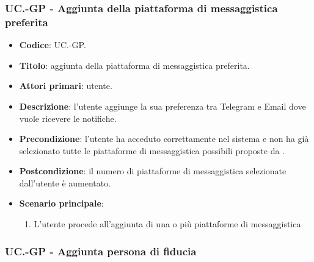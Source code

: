 	\subsubsection{UC\theuccount.\thesubuccount-GP - Aggiunta della piattaforma di messaggistica preferita}
		
		\begin{itemize}
			\item \textbf{Codice}: UC\theuccount.\thesubuccount-GP.
			\item \textbf{Titolo}: aggiunta della piattaforma di messaggistica preferita.
			\item \textbf{Attori primari}: utente.
			\item \textbf{Descrizione}: l’utente aggiunge la sua preferenza tra Telegram e Email dove vuole ricevere le notifiche.
			\item \textbf{Precondizione}: l’utente ha acceduto correttamente nel sistema e non ha già selezionato tutte le piattaforme di messaggistica possibili proposte da \progetto.
			\item \textbf{Postcondizione}: il numero di piattaforme di messaggistica selezionate dall’utente è aumentato.
			\item \textbf{Scenario principale}:
			\begin{enumerate}
				\item L'utente procede all'aggiunta di una o più piattaforme di messaggistica
			\end{enumerate}
		\end{itemize}
	
	\subsubsection{UC\theuccount.\thesubuccount-GP - Aggiunta persona di fiducia}
		
